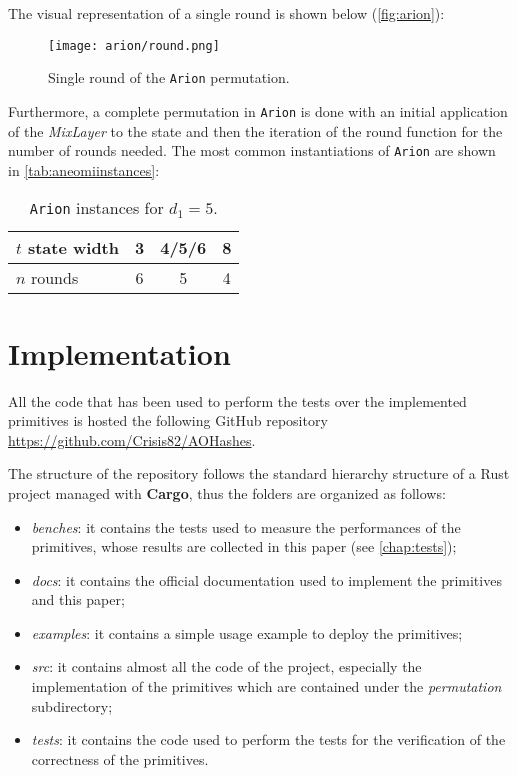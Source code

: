 \documentclass[12pt, a4paper]{report}
\begin{document}
The visual representation of a single round is shown below (\autoref{fig:arion}):

\begin{figure}[H]
  \begin{center}
    \texttt{[image: arion/round.png]}
  \end{center}
  \caption{Single round of the \texttt{Arion} permutation.}\label{fig:arion}
\end{figure}

Furthermore, a complete permutation in \texttt{Arion} is done with an initial application of the \textit{MixLayer} to the state and then the iteration of the round function for the number of rounds needed.
The most common instantiations of \texttt{Arion} are shown in \autoref{tab:aneomiinstances}:
\begin{table}[H]
  \caption{\texttt{Arion} instances for $d_1 = 5$.}\label{tab:aneomiinstances}
  \begin{center}
    \begin{tabular}{|l|c|c|c|}
      \hline
      $t$ state width & 3 & 4/5/6 & 8 \\
      \hline
      $n$ rounds & 6 & 5 & 4 \\
      \hline
    \end{tabular}
  \end{center}
\end{table}

\section{Implementation}\label{sec:implementation}

All the code that has been used to perform the tests over the implemented primitives is hosted the following GitHub repository \url{https://github.com/Crisis82/AOHashes}.

The structure of the repository follows the standard hierarchy structure of a Rust project managed with \textbf{Cargo}, thus the folders are organized as follows:
\begin{itemize}
  \item \textit{benches}: it contains the tests used to measure the performances of the primitives, whose results are collected in this paper (see \autoref{chap:tests});
  \item \textit{docs}: it contains the official documentation used to implement the primitives and this paper;
  \item \textit{examples}: it contains a simple usage example to deploy the primitives;
  \item \textit{src}: it contains almost all the code of the project, especially the implementation of the primitives which are contained under the \textit{permutation} subdirectory;
  \item \textit{tests}: it contains the code used to perform the tests for the verification of the correctness of the primitives.
\end{itemize}
\end{document}
